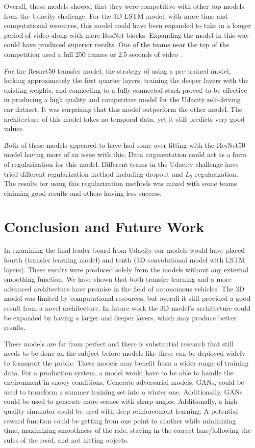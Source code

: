 \documentclass[10pt,twocolumn,letterpaper]{article}
\begin{document}
Overall, these models showed that they were competitive with other top models from the Udacity challenge. For the 3D LSTM model, with more time and computational resources, this model could have been expanded to take in a longer period of video along with more ResNet blocks. Expanding the model in this way could have produced superior results. One of the teams near the top of the competition used a full 250 frames or 2.5 seconds of video \cite{udacity}.

For the Resnet50 transfer model, the strategy of using a pre-trained model, locking approximately the first quarter layers, training the deeper layers with the existing weights, and connecting to a fully connected stack proved to be effective in producing a high quality and competitive model for the Udacity self-driving car dataset. It was surprising that this model outperform the other model. The architecture of this model takes no temporal data, yet it still predicts very good values.

Both of these models appeared to have had some over-fitting with the ResNet50 model having more of an issue with this. Data augmentation could act as a form of regularization for this model. Different teams in the Udacity challenge have tried different regularization method including dropout and $L_{2}$ regularization. The results for using this regularization methods was mixed with some teams claiming good results and others having less success. 


\section{Conclusion and Future Work}

In examining the final leader board from Udacity our models would have placed fourth (transfer learning model) and tenth (3D convolutional model with LSTM layers). These results were produced solely from the models without any external smoothing function. We have shown that both transfer learning and a more advanced architecture have promise in the field of autonomous vehicles. The 3D model was limited by computational resources, but overall it still provided a good result from a novel architecture. In future work the 3D model's architecture could be expanded by having a larger and deeper layers, which may produce better results.

These models are far from perfect and there is substantial research that still needs to be done on the subject before models like these can be deployed widely to transport the public. These models may benefit from a wider range of training data. For a production system, a model would have to be able to handle the environment in snowy conditions. Generate adversarial models, GANs, could be used to transform a summer training set into a winter one. Additionally, GANs could be used to generate more scenes with sharp angles. Additionally, a high quality simulator could be used with deep reinforcement learning. A potential reward function could be getting from one point to another while minimizing time, maximizing smoothness of the ride, staying in the correct lane/following the rules of the road, and not hitting objects.




{\small


}
\end{document}
